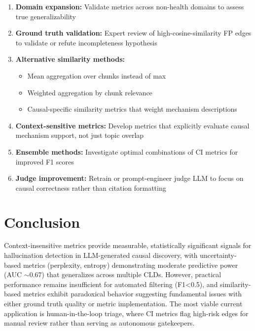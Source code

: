\begin{enumerate}
    \item \textbf{Domain expansion:} Validate metrics across non-health domains to assess true generalizability
    
    \item \textbf{Ground truth validation:} Expert review of high-cosine-similarity FP edges to validate or refute incompleteness hypothesis
    
    \item \textbf{Alternative similarity methods:}
    \begin{itemize}
        \item Mean aggregation over chunks instead of max
        \item Weighted aggregation by chunk relevance
        \item Causal-specific similarity metrics that weight mechanism descriptions
    \end{itemize}
    
    \item \textbf{Context-sensitive metrics:} Develop metrics that explicitly evaluate causal mechanism support, not just topic overlap
    
    \item \textbf{Ensemble methods:} Investigate optimal combinations of CI metrics for improved F1 scores
    
    \item \textbf{Judge improvement:} Retrain or prompt-engineer judge LLM to focus on causal correctness rather than citation formatting
\end{enumerate}

\section{Conclusion}

Context-insensitive metrics provide measurable, statistically significant signals for hallucination detection in LLM-generated causal discovery, with uncertainty-based metrics (perplexity, entropy) demonstrating moderate predictive power (AUC $\sim$0.67) that generalizes across multiple CLDs. However, practical performance remains insufficient for automated filtering (F1<0.5), and similarity-based metrics exhibit paradoxical behavior suggesting fundamental issues with either ground truth quality or metric implementation. The most viable current application is human-in-the-loop triage, where CI metrics flag high-risk edges for manual review rather than serving as autonomous gatekeepers.



